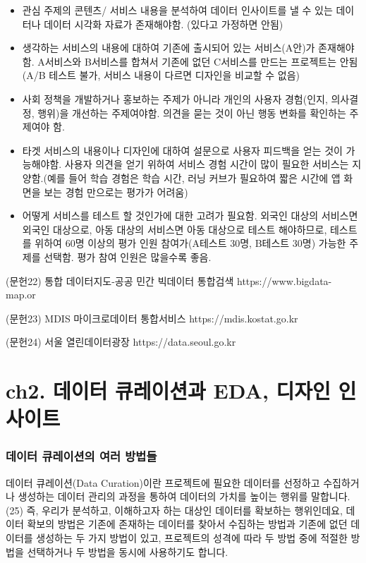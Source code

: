 \documentclass[
  letterpaper,
]{book}
\providecommand{\tightlist}{%
  \setlength{\itemsep}{0pt}\setlength{\parskip}{0pt}}\usepackage{longtable,booktabs,array}
\begin{document}
\begin{itemize}
\tightlist
\item
  관심 주제의 콘텐츠/ 서비스 내용을 분석하여 데이터 인사이트를 낼 수
  있는 데이터나 데이터 시각화 자료가 존재해야함. (있다고 가정하면 안됨)
\item
  생각하는 서비스의 내용에 대하여 기존에 출시되어 있는 서비스(A안)가
  존재해야함. A서비스와 B서비스를 합쳐서 기존에 없던 C서비스를 만드는
  프로젝트는 안됨 (A/B 테스트 불가, 서비스 내용이 다르면 디자인을 비교할
  수 없음)
\item
  사회 정책을 개발하거나 홍보하는 주제가 아니라 개인의 사용자 경험(인지,
  의사결정, 행위)을 개선하는 주제여야함. 의견을 묻는 것이 아닌 행동
  변화를 확인하는 주제여야 함.
\item
  타겟 서비스의 내용이나 디자인에 대하여 설문으로 사용자 피드백을 얻는
  것이 가능해야함. 사용자 의견을 얻기 위하여 서비스 경험 시간이 많이
  필요한 서비스는 지양함.(예를 들어 학습 경험은 학습 시간, 러닝 커브가
  필요하여 짧은 시간에 앱 화면을 보는 경험 만으로는 평가가 어려움)
\item
  어떻게 서비스를 테스트 할 것인가에 대한 고려가 필요함. 외국인 대상의
  서비스면 외국인 대상으로, 아동 대상의 서비스면 아동 대상으로 테스트
  해야하므로, 테스트를 위하여 60명 이상의 평가 인원 참여가(A테스트 30명,
  B테스트 30명) 가능한 주제를 선택함. 평가 참여 인원은 많을수록 좋음.
\end{itemize}

(문헌22) 통합 데이터지도-공공 민간 빅데이터 통합검색
https://www.bigdata-map.or

(문헌23) MDIS 마이크로데이터 통합서비스 https://mdis.kostat.go.kr

(문헌24) 서울 열린데이터광장 https://data.seoul.go.kr

\chapter{ch2. 데이터 큐레이션과 EDA, 디자인
인사이트}\label{ch2.-uxb370uxc774uxd130-uxd050uxb808uxc774uxc158uxacfc-eda-uxb514uxc790uxc778-uxc778uxc0acuxc774uxd2b8}

\subsection{데이터 큐레이션의 여러
방법들}\label{uxb370uxc774uxd130-uxd050uxb808uxc774uxc158uxc758-uxc5ecuxb7ec-uxbc29uxbc95uxb4e4}

데이터 큐레이션(Data Curation)이란 프로젝트에 필요한 데이터를 선정하고
수집하거나 생성하는 데이터 관리의 과정을 통하여 데이터의 가치를 높이는
행위를 말합니다.(25) 즉, 우리가 분석하고, 이해하고자 하는 대상인
데이터를 확보하는 행위인데요, 데이터 확보의 방법은 기존에 존재하는
데이터를 찾아서 수집하는 방법과 기존에 없던 데이터를 생성하는 두 가지
방법이 있고, 프로젝트의 성격에 따라 두 방법 중에 적절한 방법을
선택하거나 두 방법을 동시에 사용하기도 합니다.
\end{document}
